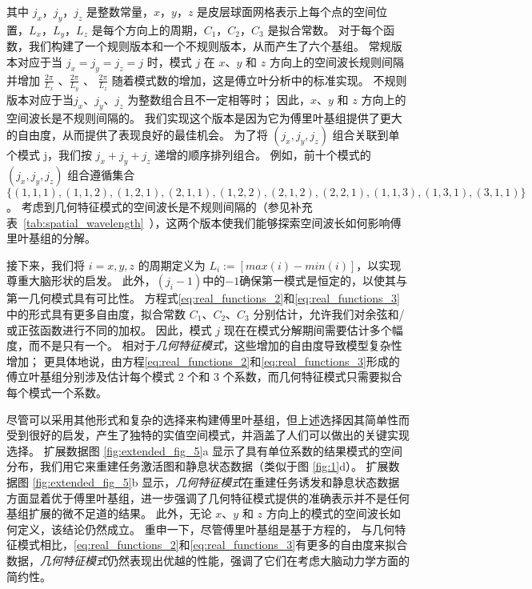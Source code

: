 \documentclass[lang=cn,a4paper,newtx,citestyle=gb7714-2015, bibstyle=gb7714-2015]{elegantpaper}
\begin{document}
其中 $ j_x $，$ j_y $，$ j_z $ 是整数常量，$ x $，$ y $，$ z $ 是皮层球面网格表示上每个点的空间位置，$ L_x $，$ L_y $，$ L_z $ 是每个方向上的周期，$ C_1 $，$ C_2 $，$ C_3 $ 是拟合常数。
对于每个函数，我们构建了一个规则版本和一个不规则版本，从而产生了六个基组。
常规版本对应于当 $ j_x=j_y=j_z=j $ 时，模式 $ j $ 在 $ x $、$ y $ 和 $ z $ 方向上的空间波长规则间隔并增加 $ \frac{2 \pi}{L_x} $ 、$\frac{2 \pi}{L_y}$ 、 $\frac{2 \pi}{L_z}$ 随着模式数的增加，这是傅立叶分析中的标准实现。
不规则版本对应于当$ j_x $、$ j_y $、$ j_z $ 为整数组合且不一定相等时；
因此，$ x $、$ y $ 和 $ z $ 方向上的空间波长是不规则间隔的。
我们实现这个版本是因为它为傅里叶基组提供了更大的自由度，从而提供了表现良好的最佳机会。
为了将 $ (j_x,j_y,j_z) $ 组合关联到单个模式 j，我们按 $ j_x+j_y+j_z $ 递增的顺序排列组合。
例如，前十个模式的 $ (j_x,j_y,j_z) $ 组合遵循集合 $ \{(1,1,1),(1,1,2),(1,2,1),(2,1, 1),(1,2,2),(2,1,2),(2,2,1),(1,1,3),(1,3,1),(3,1,1) \} $。
考虑到几何特征模式的空间波长是不规则间隔的（参见补充表~\ref{tab:spatial_wavelength}~），这两个版本使我们能够探索空间波长如何影响傅里叶基组的分解。


接下来，我们将 $ i=x, y, z $ 的周期定义为 $ L_i := [ max(i) - min(i) ] $，以实现尊重大脑形状的启发。 
此外，$ (j_i-1) $中的$ -1 $确保第一模式是恒定的，以使其与第一几何模式具有可比性。
方程式\ref{eq:real_functions_2}和\ref{eq:real_functions_3}中的形式具有更多自由度，拟合常数 $ C_1 $、$ C_2 $、$ C_3 $ 分别估计，允许我们对余弦和/或正弦函数进行不同的加权。
因此，模式 $ j $ 现在在模式分解期间需要估计多个幅度，而不是只有一个。
相对于\textit{几何特征模式}，这些增加的自由度导致模型复杂性增加；
更具体地说，由方程\ref{eq:real_functions_2}和\ref{eq:real_functions_3}形成的傅立叶基组分别涉及估计每个模式 2 个和 3 个系数，而几何特征模式只需要拟合每个模式一个系数。


尽管可以采用其他形式和复杂的选择来构建傅里叶基组，但上述选择因其简单性而受到很好的启发，产生了独特的实值空间模式，并涵盖了人们可以做出的关键实现选择。
扩展数据图 \ref{fig:extended_fig_5}a 显示了具有单位系数的结果模式的空间分布，我们用它来重建任务激活图和静息状态数据（类似于图 \ref{fig:1}d）。
扩展数据图 \ref{fig:extended_fig_5}b 显示，\textit{几何特征模式}在重建任务诱发和静息状态数据方面显着优于傅里叶基组，进一步强调了几何特征模式提供的准确表示并不是任何基组扩展的微不足道的结果。
此外，无论 $ x $、$ y $ 和 $ z $ 方向上的模式的空间波长如何定义，该结论仍然成立。
重申一下，尽管傅里叶基组是基于方程的，
与几何特征模式相比，\ref{eq:real_functions_2}和\ref{eq:real_functions_3}有更多的自由度来拟合数据，\textit{几何特征模式}仍然表现出优越的性能，强调了它们在考虑大脑动力学方面的简约性。
\end{document}
